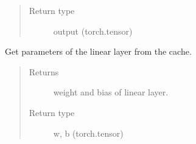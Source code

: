 \documentclass[letterpaper,10pt,english,openany,oneside]{sphinxmanual}
\begin{document}
\begin{fulllineitems}
\begin{fulllineitems}
\begin{quote}
\begin{description}
\item[{Return type}] \leavevmode
output (torch.tensor)

\end{description}\end{quote}

\end{fulllineitems}


\begin{fulllineitems}
\label{\detokenize{nn:nn.linear.Linear.param}}
Get parameters of the linear layer from the cache.
\begin{quote}\begin{description}
\item[{Returns}] \leavevmode
weight and bias of linear layer.

\item[{Return type}] \leavevmode
w, b (torch.tensor)

\end{description}\end{quote}

\end{fulllineitems}


\end{fulllineitems}

\end{document}
